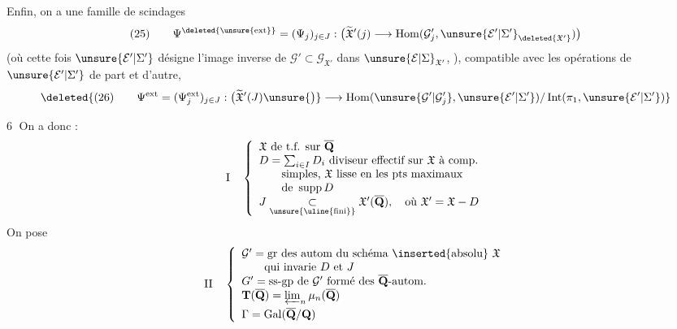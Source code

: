 Enfin, on a une famille de scindages 
\[
(25)\qquad\Psi^{\deleted{\unsure{\mathrm{ext}}}}=(\Psi_j)_{j\in J}:\bigl(\widetilde{\mathfrak X}'(j)\longrightarrow\operatorname{Hom}(\mathcal G'_j,\unsure{\mathcal E'|\Sigma'}_{\deleted{\mathfrak X'}})\bigr)
\]
(où cette fois $\unsure{\mathcal E'|\Sigma'}$ désigne l'image inverse
de $\mathcal G'\subset\mathcal G_{\mathfrak X'}$ dans $\unsure{\mathcal E|\Sigma}_{\mathfrak X'}$, ), compatible
avec les opérations de $\unsure{\mathcal E'|\Sigma'}$ de part et
d'autre, 
\[
\deleted{(26)\qquad\Psi^{\mathrm{ext}}=(\Psi_j^{\mathrm{ext}})_{j\in J}:\bigl(\widetilde{\mathfrak X}'(J)\unsure{\bigr)}\longrightarrow\operatorname{Hom}(\unsure{\mathcal G'|\mathcal G'_j},\unsure{\mathcal E'|\Sigma'})/\operatorname{Int}(\pi_1,\unsure{\mathcal E'|\Sigma'})}
\]

\textcircled{6}  On a donc : 
\[
\mathrm I\quad\left\{\begin{array}{l}
\mathfrak X\text{ de t.f. sur }\overline{\mathbf Q}\\
D=\sum_{i\in I}D_i\text{ diviseur effectif sur }\mathfrak X\text{ à comp.}\\
\qquad\text{simples, }\mathfrak X\text{ lisse en les pts maximaux}\\
\qquad\text{de }\operatorname{supp}D\\
J\underset{\text{\unsure{\uline{fini}}}}{\subset}\mathfrak X'(\overline{\mathbf Q}),\quad\text{où }\mathfrak X'=\mathfrak X-D
\end{array}\right.
\]
On pose\margin{(}
\[
\mathrm{II}\quad\left\{\begin{array}{l}
\mathcal G'=\text{gr des autom du schéma \inserted{absolu} }\mathfrak X\\
\qquad\text{qui invarie }D\text{ et }J\\
G'=\text{ss-gp de }\mathcal G'\text{ formé des }\overline{\mathbf Q}\text{-autom.}\\
\mathbf T(\overline{\mathbf Q})=\varprojlim_n\mu_n(\overline{\mathbf Q})\\[1ex]
\Gamma=\operatorname{Gal}(\overline{\mathbf Q}/\mathbf Q)
\end{array}\right.
\]
